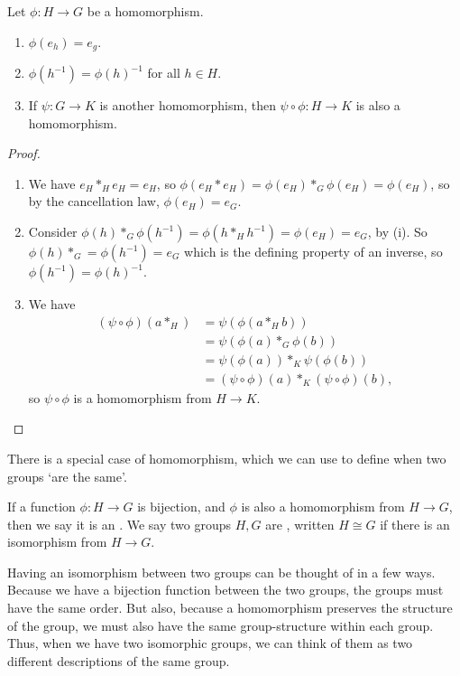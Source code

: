 \documentclass[a4paper]{scrartcl}
\begin{document}
\begin{proposition}
	Let $\phi : H \rightarrow G$ be a homomorphism.
	\begin{enumerate}[label=(\roman*)]
		\item $\phi(e_h) = e_g$. 
		\item $\phi(h^{-1}) = \phi(h)^{-1}$ for all $h \in H$.
		\item If $\psi : G \rightarrow K$ is another homomorphism, then $\psi \circ \phi : H \rightarrow K$ is also a homomorphism.
	\end{enumerate}
\end{proposition}
\begin{proof}
	$ $ \phantom{\qedhere}
	\begin{enumerate}[label=(\roman*)]
		\item We have $e_H *_H e_H = e_H$, so $\phi(e_H * e_H) = \phi(e_H) *_G \phi(e_H) = \phi(e_H)$, so by the cancellation law, $\phi(e_H) = e_G$.
		\item Consider $\phi(h) *_G \phi(h^{-1}) = \phi(h *_H h^{-1}) = \phi(e_H) = e_G$, by (i). So $\phi(h) *_G = \phi(h^{-1}) = e_G$ which is the defining property of an inverse, so $\phi(h^{-1}) = \phi(h)^{-1}$.
		\item We have 
		\begin{align*}
			(\psi \circ \phi)(a *_H) &= \psi(\phi(a *_H b))\\
									 &= \psi(\phi(a) *_G \phi(b))\\ 
									 &= \psi(\phi(a)) *_K \psi(\phi(b)) \\
									 &= (\psi \circ \phi)(a) *_K (\psi \circ \phi)(b),
		\end{align*}
		so $\psi \circ \phi$ is a homomorphism from $H \rightarrow K$.\hfill \qedsymbol
	\end{enumerate}
\end{proof}


There is a special case of homomorphism, which we can use to define when two groups `are the same'.

\begin{definition}[Isomorphism]
	If a function $\phi : H \rightarrow G$ is bijection, and $\phi$ is also a homomorphism from $H \rightarrow G$, then we say it is an . We say two groups $H, G$ are , written $H \cong G$ if there is an isomorphism from $H \rightarrow G$.
\end{definition}

Having an isomorphism between two groups can be thought of in a few ways. Because we have a bijection function between the two groups, the groups must have the same order. But also, because a homomorphism preserves the structure of the group, we must also have the same group-structure within each group. Thus, when we have two isomorphic groups, we can think of them as two different descriptions of the same group.
\end{document}
